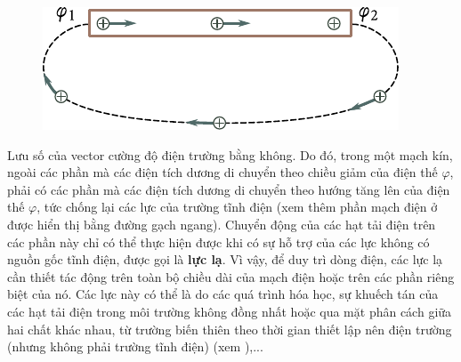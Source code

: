 \begin{figure}[!htb]
	\begin{center}
		\includegraphics[scale=1]{figures/ch_05/fig_5_3.pdf}
		\caption[]{}
		\label{fig:5_3}
	\end{center}
	\vspace{-0.8cm}
\end{figure}
Lưu số của vector cường độ điện trường bằng không. Do đó, trong một mạch kín, ngoài các phần mà các điện tích dương di chuyển theo chiều giảm của điện thế $\varphi$, phải có các phần mà các điện tích dương di chuyển theo hướng tăng lên của điện thế $\varphi$, tức chống lại các lực của trường tĩnh điện (xem thêm phần mạch điện ở  được hiển thị bằng đường gạch ngang). Chuyển động của các hạt tải điện trên các phần này chỉ có thể thực hiện được khi có sự hỗ trợ của các lực không có nguồn gốc tĩnh điện, được gọi là \textbf{lực lạ}. Vì vậy, để duy trì dòng điện, các lực lạ cần thiết tác động trên toàn bộ chiều dài của mạch điện hoặc trên các phần riêng biệt của nó. Các lực này có thể là do các quá trình hóa học, sự khuếch tán của các hạt tải điện trong môi trường không đồng nhất hoặc qua mặt phân cách giữa hai chất khác nhau, từ trường biến thiên theo thời gian thiết lập nên điện trường (nhưng không phải trường tĩnh điện) (xem ),...


